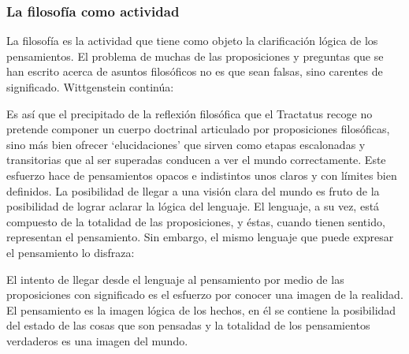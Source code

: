 \subsubsection{La filosofía como actividad}

La filosofía es la actividad que tiene como objeto la clarificación lógica
de los pensamientos.\autocite[4.112 p. 52]{wittgenstein1922tractatus} El problema de muchas de
las proposiciones y preguntas que se han escrito acerca de asuntos filosóficos
no es que sean falsas, sino carentes de significado. Wittgenstein continúa: 

Es así que el precipitado de la reflexión filosófica que el Tractatus recoge no
pretende componer un cuerpo doctrinal articulado por proposiciones filosóficas,
sino más bien ofrecer `elucidaciones' que sirven como etapas escalonadas y
transitorias que al ser superadas conducen a ver el mundo correctamente. Este
esfuerzo hace de pensamientos opacos e indistintos unos claros y con límites
bien definidos.\autocite[cf. 4.112 y 6.54]{wittgenstein1922tractatus} 
La posibilidad de llegar a una visión clara del mundo es fruto de la posibilidad
de lograr aclarar la lógica del lenguaje. El lenguaje, a su vez, está compuesto
de la totalidad de las proposiciones, y éstas, cuando tienen sentido,
representan el pensamiento.\autocite[cf. 4 y 4.001]{wittgenstein1922tractatus} 
Sin embargo, el mismo lenguaje que puede expresar el pensamiento lo disfraza:


El intento de llegar desde el lenguaje al pensamiento por medio de las
proposiciones con significado es el esfuerzo por conocer una imagen de la
realidad. El pensamiento es la imagen lógica de los hechos, en él se contiene la
posibilidad del estado de las cosas que son pensadas y la totalidad de los
pensamientos verdaderos es una imagen del mundo.\autocite[cf.][3 y
3.001]{wittgenstein1922tractatus}

